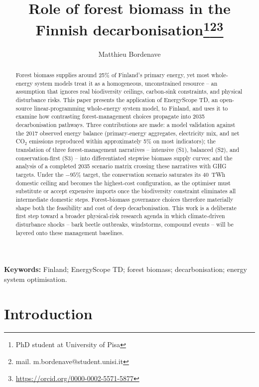 \documentclass{article}
\title{Role of forest biomass in the Finnish decarbonisation\footnote{PhD student at University of Pisa}\footnote{mail. m.bordenave@student.unisi.it}\footnote{\url{https://orcid.org/0000-0002-5571-5877}}}
\author{Matthieu Bordenave}
\date{}
\begin{document}
\maketitle{}
\begin{abstract}
Forest biomass supplies around 25\% of Finland's primary energy, yet most whole-energy system models treat it as a homogeneous, unconstrained resource -- an assumption that ignores real biodiversity ceilings, carbon-sink constraints, and physical disturbance risks. This paper presents the application of EnergyScope TD, an open-source linear-programming whole-energy system model, to Finland, and uses it to examine how contrasting forest-management choices propagate into 2035 decarbonisation pathways. Three contributions are made: a model validation against the 2017 observed energy balance (primary-energy aggregates, electricity mix, and net CO$_2$ emissions reproduced within approximately 5\% on most indicators); the translation of three forest-management narratives -- intensive (S1), balanced (S2), and conservation-first (S3) -- into differentiated stepwise biomass supply curves; and the analysis of a completed 2035 scenario matrix crossing these narratives with GHG targets. Under the $-95\%$ target, the conservation scenario saturates its 40~TWh domestic ceiling and becomes the highest-cost configuration, as the optimiser must substitute or accept expensive imports once the biodiversity constraint eliminates all intermediate domestic steps. Forest-biomass governance choices therefore materially shape both the feasibility and cost of deep decarbonisation. This work is a deliberate first step toward a broader physical-risk research agenda in which climate-driven disturbance shocks -- bark beetle outbreaks, windstorms, compound events -- will be layered onto these management baselines.
\end{abstract}

\noindent\textbf{Keywords:} Finland; EnergyScope TD; forest biomass; decarbonisation; energy system optimisation.

\newpage

\section{Introduction}
\end{document}
